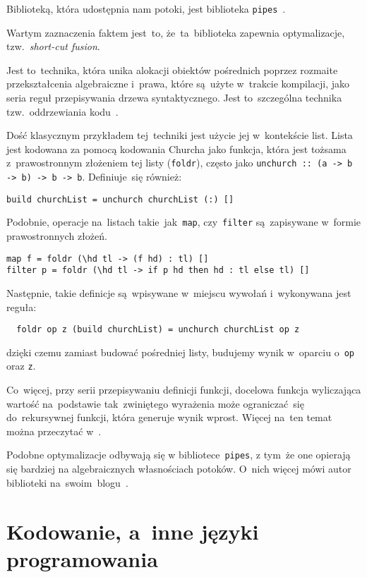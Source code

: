 \documentclass[../../thesis.tex]{subfiles}
\begin{document}
Biblioteką, która udostępnia nam potoki, jest biblioteka \texttt{pipes}~\cite{Hackage:Pipes}.

Wartym zaznaczenia faktem jest~to, że~ta~biblioteka zapewnia optymalizacje,
tzw.~\emph{short-cut fusion}. 

Jest to~technika, która unika alokacji obiektów pośrednich poprzez rozmaite
przekształcenia algebraiczne i~prawa, które są~użyte w~trakcie kompilacji,
jako seria reguł przepisywania drzewa syntaktycznego. Jest to~szczególna
technika tzw.~oddrzewiania kodu~\cite{Gill:SCD}.

Dość klasycznym przykładem tej~techniki jest użycie jej w~kontekście list.
Lista jest kodowana za pomocą kodowania Churcha jako funkcja, która jest
tożsama z~prawostronnym złożeniem tej listy (\texttt{foldr}), często jako 
\texttt{unchurch :: (a -> b -> b) -> b -> b}.
Definiuje~się również:
\begin{verbatim}
build churchList = unchurch churchList (:) []
\end{verbatim}

Podobnie, operacje na~listach takie~jak~\texttt{map}, czy~\texttt{filter} 
są~zapisywane w~formie prawostronnych złożeń.

\begin{verbatim}
map f = foldr (\hd tl -> (f hd) : tl) []
filter p = foldr (\hd tl -> if p hd then hd : tl else tl) []
\end{verbatim}

Następnie, takie definicje są~wpisywane w~miejscu wywołań i~wykonywana jest reguła:
\begin{verbatim}
  foldr op z (build churchList) = unchurch churchList op z
\end{verbatim}
dzięki czemu zamiast budować pośredniej listy, budujemy wynik
w~oparciu o~\texttt{op} oraz \texttt{z}.

Co~więcej, przy serii przepisywaniu definicji funkcji, docelowa funkcja wyliczająca
wartość na~podstawie tak~zwiniętego wyrażenia może ograniczać~się do~rekursywnej funkcji,
która generuje wynik wprost. Więcej na~ten temat można przeczytać w~\cite{Gill:SCD}.

Podobne optymalizacje odbywają się w bibliotece~\texttt{pipes}, z tym~że one opierają się
bardziej na algebraicznych własnościach potoków. O~nich więcej mówi autor biblioteki
na~swoim~blogu~\cite{Gonzalez:SFP}.

\section{Kodowanie, a~inne języki programowania}
\end{document}
